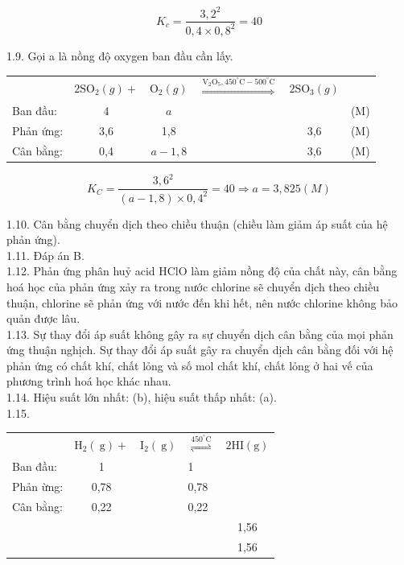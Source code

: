 \documentclass[10pt]{article}
\begin{document}
$$
K_{c}=\frac{3,2^{2}}{0,4 \times 0,8^{2}}=40
$$

1.9. Gọi a là nồng độ oxygen ban đầu cần lấy.

\begin{center}
\begin{tabular}{lcclcl}
 & $2 \mathrm{SO}_{2}(g)+$ & $\mathrm{O}_{2}(g)$ & $\stackrel{\mathrm{V}_{2} \mathrm{O}_{5}, 450^{\circ} \mathrm{C}-500^{\circ} \mathrm{C}}{\Longrightarrow}$ & $2 \mathrm{SO}_{3}(g)$ &  \\
Ban đầu: & 4 & $a$ &  &  & (M) \\
Phản ứng: & 3,6 & 1,8 &  & 3,6 & (M) \\
Cân bằng: & 0,4 & $a-1,8$ &  & 3,6 & (M) \\
\end{tabular}
\end{center}

$$
K_{C}=\frac{3,6^{2}}{(a-1,8) \times 0,4^{2}}=40 \Rightarrow a=3,825(M)
$$

1.10. Cân bằng chuyển dịch theo chiều thuận (chiều làm giảm áp suất của hệ phản ứng).\\
1.11. Đáp án B.\\
1.12. Phản ứng phân huỷ acid HClO làm giảm nồng độ của chất này, cân bằng hoá học của phản ứng xảy ra trong nước chlorine sẽ chuyển dịch theo chiều thuận, chlorine sẽ phản ứng với nước đến khi hết, nên nước chlorine không bảo quản được lâu.\\
1.13. Sự thay đổi áp suất không gây ra sự chuyển dịch cân bằng của mọi phản ứng thuận nghịch. Sự thay đổi áp suất gây ra chuyển dịch cân bằng đối với hệ phản ứng có chất khí, chất lỏng và số mol chất khí, chất lỏng ở hai vế của phương trình hoá học khác nhau.\\
1.14. Hiệu suất lớn nhất: (b), hiệu suất thấp nhất: (a).\\
1.15.

\begin{center}
\begin{tabular}{lcclc}
 & $\mathrm{H}_{2}(\mathrm{~g})+$ & $\mathrm{I}_{2}(\mathrm{~g})$ & $\stackrel{450^{\circ} \mathrm{C}}{\rightleftharpoons}$ & $2 \mathrm{HI}(\mathrm{g})$ \\
Ban đầu: & 1 &  & 1 &  \\
Phản ừng: & 0,78 &  & 0,78 &  \\
Cân bằng: & 0,22 &  & 0,22 &  \\
 &  &  &  & 1,56 \\
 &  &  &  & 1,56 \\
\end{tabular}
\end{center}
\end{document}
